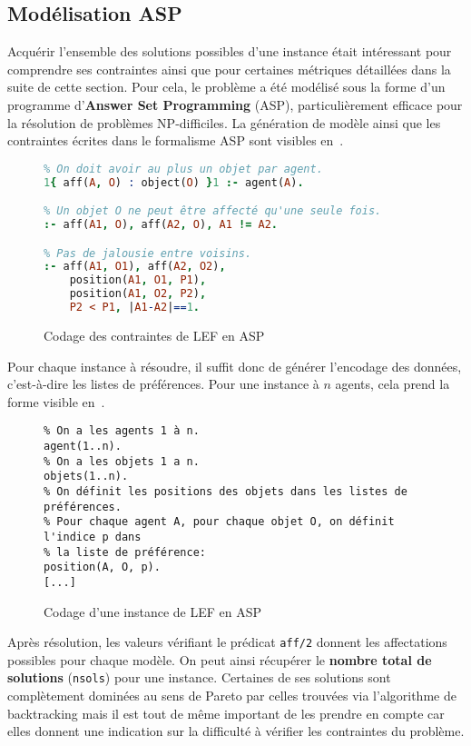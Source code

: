 \documentclass[../main.tex]{subfiles}
\begin{document}
	\subsection{Modélisation ASP}
	Acquérir l'ensemble des solutions possibles d'une instance était intéressant pour comprendre ses contraintes ainsi que pour certaines métriques détaillées dans la suite de cette section. Pour cela, le problème a été modélisé sous la forme d'un programme d'\textbf{Answer Set Programming} (ASP), particulièrement efficace pour la résolution de problèmes NP-difficiles. La génération de modèle ainsi que les contraintes écrites dans le formalisme ASP sont visibles en~.
\begin{figure}[ht!]
\begin{lstlisting}[language=Prolog]
% Génération:
% On doit avoir au plus un objet par agent.
1{ aff(A, O) : object(O) }1 :- agent(A).

% Un objet O ne peut être affecté qu'une seule fois.
:- aff(A1, O), aff(A2, O), A1 != A2.

% Pas de jalousie entre voisins.
:- aff(A1, O1), aff(A2, O2), 
	position(A1, O1, P1), 
	position(A1, O2, P2), 
	P2 < P1, |A1-A2|==1.
\end{lstlisting}
\caption{Codage des contraintes de LEF en ASP}
\label{asp-pbm}
\end{figure}
Pour chaque instance à résoudre, il suffit donc de générer l'encodage des données, c'est-à-dire les listes de préférences. Pour une instance à $n$ agents, cela prend la forme visible en~.
\begin{figure}[ht!]
\begin{lstlisting}
% On a les agents 1 à n.
agent(1..n).
% On a les objets 1 a n.
objets(1..n).
% On définit les positions des objets dans les listes de préférences.
% Pour chaque agent A, pour chaque objet O, on définit l'indice p dans
% la liste de préférence:
position(A, O, p).
[...]
\end{lstlisting}
\caption{Codage d'une instance de LEF en ASP}
\label{asp-inst}
\end{figure}
Après résolution, les valeurs vérifiant le prédicat \texttt{aff/2} donnent les affectations possibles pour chaque modèle. On peut ainsi récupérer le \textbf{nombre total de solutions} (\texttt{nsols}) pour une instance. Certaines de ses solutions sont complètement dominées au sens de Pareto par celles trouvées via l'algorithme de backtracking mais il est tout de même important de les prendre en compte car elles donnent une indication sur la difficulté à vérifier les contraintes du problème.
\end{document}
